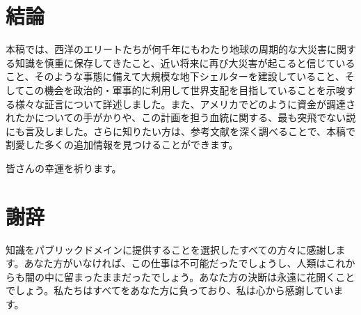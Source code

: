 \documentclass[10pt,twocolumn,letterpaper]{article}
\begin{document}
\section{結論}

本稿では、西洋のエリートたちが何千年にもわたり地球の周期的な大災害に関する知識を慎重に保存してきたこと、近い将来に再び大災害が起こると信じていること、そのような事態に備えて大規模な地下シェルターを建設していること、そしてこの機会を政治的・軍事的に利用して世界支配を目指していることを示唆する様々な証言について詳述しました。また、アメリカでどのように資金が調達されたかについての手がかりや、この計画を担う血統に関する、最も突飛でない説にも言及しました。さらに知りたい方は、参考文献を深く調べることで、本稿で割愛した多くの追加情報を見つけることができます。

皆さんの幸運を祈ります。

\section{謝辞}

知識をパブリックドメインに提供することを選択したすべての方々に感謝します。あなた方がいなければ、この仕事は不可能だったでしょうし、人類はこれからも闇の中に留まったままだったでしょう。あなた方の決断は永遠に花開くことでしょう。私たちはすべてをあなた方に負っており、私は心から感謝しています。

\clearpage
\twocolumn

{\small


}
\end{document}
